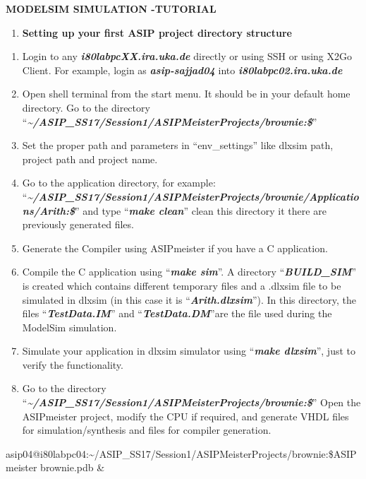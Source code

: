 \documentclass[
]{article}
\author{}
\date{}
\begin{document}
\textbf{MODELSIM SIMULATION -TUTORIAL}

\begin{enumerate}
\def\labelenumi{\Alph{enumi}.}
\item
  \textbf{Setting up your first ASIP project directory structure}
\end{enumerate}

\begin{enumerate}
\def\labelenumi{\arabic{enumi}.}
\item
  Login to any \emph{\textbf{i80labpcXX.ira.uka.de}} directly or using
  SSH or using X2Go Client. For example, login as
  \emph{\textbf{asip-sajjad04}} into
  \emph{\textbf{i80labpc02.ira.uka.de}}
\item
  Open shell terminal from the start menu. It should be in your default
  home directory. Go to the directory
  ``\emph{\textbf{\textasciitilde/ASIP\_SS17/Session1/ASIPMeisterProjects/brownie:\$}}''
\item
  Set the proper path and parameters in ``env\_settings'' like dlxsim
  path, project path and project name.
\item
  Go to the application directory, for example:
  ``\emph{\textbf{\textasciitilde/ASIP\_SS17/Session1/ASIPMeisterProjects/brownie/Applications/Arith:\$}}''
  and type ``\emph{\textbf{make clean}}'' clean this directory it there
  are previously generated files.
\item
  Generate the Compiler using ASIPmeister if you have a C application.
\item
  Compile the C application using ``\emph{\textbf{make sim}}''. A
  directory ``\emph{\textbf{BUILD\_SIM}}'' is created which contains
  different temporary files and a .dlxsim file to be simulated in dlxsim
  (in this case it is ``\emph{\textbf{Arith.dlxsim}}''). In this
  directory, the files ``\emph{\textbf{TestData.IM}}'' and
  ``\emph{\textbf{TestData.DM}}''are the file used during the ModelSim
  simulation.
\item
  Simulate your application in dlxsim simulator using
  ``\emph{\textbf{make dlxsim}}'', just to verify the functionality.
\item
  Go to the directory
  ``\emph{\textbf{\textasciitilde/ASIP\_SS17/Session1/ASIPMeisterProjects/brownie:\$}}''
  Open the ASIPmeister project, modify the CPU if required, and generate
  VHDL files for simulation/synthesis and files for compiler generation.
\end{enumerate}

asip04@i80labpc04:\textasciitilde/ASIP\_SS17/Session1/ASIPMeisterProjects/brownie:\$ASIPmeister
brownie.pdb \&
\end{document}
